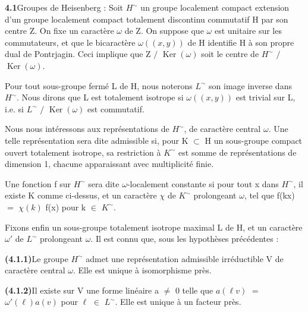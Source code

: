 \documentclass[10pt,a4paper]{article}
\begin{document}
\clearpage
{}
\label{d035-physical-019}
\par\medskip{}\par\smallskip
\par\noindent\textbf{4.1}\quad Groupes de Heisenberg : Soit $H^\sim$ un groupe localement compact extension d'un groupe localement compact totalement discontinu commutatif H par son centre Z. On fixe un caractère $\omega{}$ de Z. On suppose que $\omega{}$ est unitaire sur les commutateurs, et que le bicaractère $\omega{}((x,y))$ de H identifie H à son propre dual de Pontrjagin. Ceci implique que Z $/$ $\operatorname{Ker}(\omega{})$ soit le centre de $H^\sim$ $/$ $\operatorname{Ker}(\omega{})$.\par
\par Pour tout sous-groupe fermé L de H, nous noterons $L^\sim$ son image inverse dans $H^\sim$. Nous dirons que L est totalement isotrope si $\omega{}((x,y))$ est trivial sur L, i.e. si $L^\sim$ $/$ $\operatorname{Ker}(\omega{})$ est commutatif.\par
\par Nous nous intéressons aux représentations de $H^\sim$, de caractère central $\omega{}$. Une telle représentation sera dite admissible si, pour K $\subset{}$ H un sous-groupe compact ouvert totalement isotrope, sa restriction à $K^\sim$ est somme de représentations de dimension 1, chacune apparaissant avec multiplicité finie.\par
\par Une fonction f sur $H^\sim$ sera dite $\omega{}$-localement constante si pour tout x dans $H^\sim$, il existe K comme ci-dessus, et un caractère $\chi{}$ de $K^\sim$ prolongeant $\omega{}$, tel que f(kx) $=$ $\chi{}(k)$ f(x) pour k $\in{}$ $K^\sim$.\par
\par Fixons enfin un sous-groupe totalement isotrope maximal L de H, et un caractère $\omega{}'$ de $L^\sim$ prolongeant $\omega{}$. Il est connu que, sous les hypothèses précédentes :\par
\par\noindent\textbf{(4.1.1)}\quad Le groupe $H^\sim$ admet une représentation admissible irréductible V de caractère central $\omega{}$. Elle est unique à isomorphisme près.\par
\par\noindent\textbf{(4.1.2)}\quad Il existe sur V une forme linéaire a $\ne{}$ 0 telle que $a(\ell{}v)$ $=$ $\omega{}'(\ell{})a(v)$ pour $\ell{}$ $\in{}$ $L^\sim$. Elle est unique à un facteur près.\par
\end{document}
